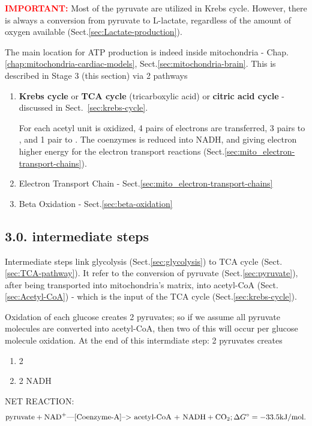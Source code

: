 \textcolor{red}{\bf IMPORTANT:} Most of the pyruvate are utilized in Krebs
cycle. However, there is always a conversion from pyruvate to L-lactate,
regardless of the amount of oxygen available
(Sect.\ref{sec:Lactate-production}).


The main location for ATP production is indeed inside mitochondria -
Chap.\ref{chap:mitochondria-cardiac-models}, Sect.\ref{sec:mitochondria-brain}.
This is described in Stage 3 (this section) via 2 pathways
\begin{enumerate}
  \item  {\bf Krebs cycle} or {\bf TCA cycle} (tricarboxylic acid) or
{\bf citric acid cycle} - discussed in Sect.~\ref{sec:krebs-cycle}.


For each acetyl unit is oxidized, 4 pairs of electrons are
transferred, 3 pairs to , and 1 pair to .
The coenzymes  is reduced into NADH, and giving electron
higher energy for the electron transport reactions
(Sect.\ref{sec:mito_electron-transport-chains}).

  \item Electron Transport Chain - Sect.\ref{sec:mito_electron-transport-chains}

  \item  Beta Oxidation - Sect.\ref{sec:beta-oxidation}
\end{enumerate}

\subsection{3.0. intermediate steps}
\label{sec:pyruvate-to-acetyl-CoA}

Intermediate steps link glycolysis (Sect.\ref{sec:glycolysis}) to TCA cycle
(Sect.\ref{sec:TCA-pathway}). It refer to the conversion of pyruvate
(Sect.\ref{sec:pyruvate}), after being transported into mitochondria's matrix,
into acetyl-CoA (Sect.\ref{sec:Acetyl-CoA}) - which is the input of the TCA cycle
(Sect.\ref{sec:krebs-cycle}).

Oxidation of each glucose creates 2 pyruvates; so if we assume all pyruvate
molecules are converted into acetyl-CoA, then two of this will occur per
glucose molecule oxidation. At the end of this intermdiate step: 2 pyruvates
creates
\begin{enumerate}
  \item 2 
  \item 2 NADH
\end{enumerate}
NET REACTION:
{\tiny
\begin{equation}
\text{pyruvate} + \ce{NAD^+}   \text{---[Coenzyme-A]-->  acetyl-CoA  +  NADH}
+ \ce{CO2}  ; \Delta G^\circ = -33.5 \text{kJ/mol.}
\end{equation}
}

